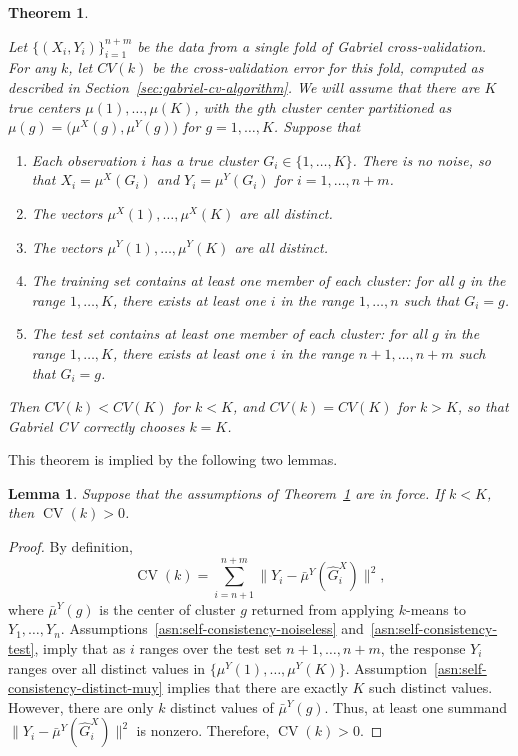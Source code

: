 \documentclass[12pt]{article}
\newtheorem{theorem}{Theorem}
\newtheorem{lemma}{Lemma}
\newcommand{\CV}{\operatorname{CV}}
\newcommand{\muX}{\mu^{X}}
\newcommand{\muY}{\mu^{Y}}
\newcommand{\bmuY}{\bar \mu^{Y}}
\newcommand{\hGX}{\hat G^{X}}
\begin{document}
\begin{theorem}\label{thm:self-consistency}

Let $\{ (X_i, Y_i) \}_{i=1}^{n+m}$ be the data from a single fold of Gabriel
cross-validation.  For any $k$, let $CV(k)$ be the cross-validation error for
this fold, computed as described in Section~\ref{sec:gabriel-cv-algorithm}.
We will assume that there are $K$ true centers $\mu(1), \dotsc,\mu(K)$, with
the $g$th cluster center partitioned as $\mu(g) = \bigl(\muX(g),
\muY(g)\bigr)$ for $g = 1, \dotsc, K$.  Suppose that
\begin{enumerate}[label=(\roman*)]
  \item \label{asn:self-consistency-noiseless}
    Each observation $i$ has a true cluster $G_i \in \{ 1, \dotsc, K \}$.
    There is no noise, so that $X_i = \muX({G_i})$ and $Y_i = \muY(G_i)$ for
    $i = 1, \dotsc, n+m$.
  \item \label{asn:self-consistency-distinct-mux}
    The vectors $\muX(1), \dotsc,\muX(K)$ are all distinct.
  \item \label{asn:self-consistency-distinct-muy}
    The vectors $\muY(1), \dotsc,\muY(K)$ are all distinct.
  \item \label{asn:self-consistency-train}
    The training set contains at least one member of each cluster: for all $g$
    in the range $1, \dotsc, K$, there exists at least one $i$ in the range
    $1, \dotsc, n$ such that $G_i = g$.
  \item \label{asn:self-consistency-test}
    The test set contains at least one member of each cluster: for all $g$ in
    the range $1, \dotsc, K$, there exists at least one $i$ in the range $n+1,
    \dotsc, n+m$ such that $G_i = g$.
\end{enumerate}
Then $CV(k) < CV(K)$ for $k < K$, and $CV(k) = CV(K)$ for $k > K$, so that
Gabriel CV correctly chooses $k = K$.
\end{theorem}

This theorem is implied by the following two lemmas.

\begin{lemma}
Suppose that the assumptions of Theorem~\ref{thm:self-consistency} are in
force.  If $k < K$, then $\CV(k) > 0$.
\end{lemma}
\begin{proof}
By definition,
\[
  \CV(k)
    =
      \sum_{i=n+1}^{n+m}
        \| Y_i - \bmuY (\hGX_i) \|^2,
\]
where $\bmuY(g)$ is the center of cluster $g$ returned from applying $k$-means
to $Y_1, \dotsc, Y_n$.  Assumptions~\ref{asn:self-consistency-noiseless}
and~\ref{asn:self-consistency-test}, imply that as $i$ ranges over the test
set $n+1, \dotsc, n+m$, the response $Y_i$ ranges over all distinct values in
$\{ \muY(1), \dotsc, \muY(K) \}$.
Assumption~\ref{asn:self-consistency-distinct-muy} implies that there are
exactly $K$ such distinct values.  However, there are only $k$ distinct values
of $\bmuY(g)$.  Thus, at least one summand
\(
  \| Y_i - \bmuY(\hGX_i) \|^2
\)
is nonzero.  Therefore,
\(
  \CV(k) > 0.
\)
\end{proof}
\end{document}
